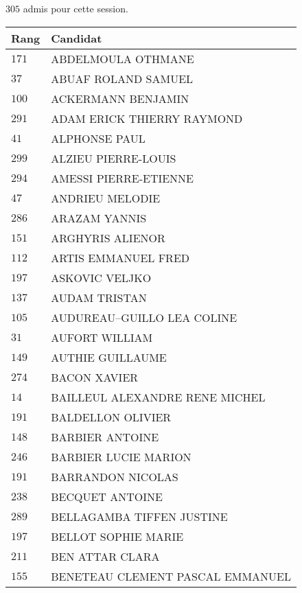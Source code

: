 



  $305$ admis pour cette session.

  \begin{xltabular}{\linewidth}{|l|X|}
    \hline
    \textbf{Rang} & \textbf{Candidat} \\
    \hline
    $171$ & ABDELMOULA OTHMANE \\
    \hline
    $37$ & ABUAF ROLAND SAMUEL \\
    \hline
    $100$ & ACKERMANN BENJAMIN \\
    \hline
    $291$ & ADAM ERICK THIERRY RAYMOND \\
    \hline
    $41$ & ALPHONSE PAUL \\
    \hline
    $299$ & ALZIEU PIERRE-LOUIS \\
    \hline
    $294$ & AMESSI PIERRE-ETIENNE \\
    \hline
    $47$ & ANDRIEU MELODIE \\
    \hline
    $286$ & ARAZAM YANNIS \\
    \hline
    $151$ & ARGHYRIS ALIENOR \\
    \hline
    $112$ & ARTIS EMMANUEL FRED \\
    \hline
    $197$ & ASKOVIC VELJKO \\
    \hline
    $137$ & AUDAM TRISTAN \\
    \hline
    $105$ & AUDUREAU--GUILLO LEA COLINE \\
    \hline
    $31$ & AUFORT WILLIAM \\
    \hline
    $149$ & AUTHIE GUILLAUME \\
    \hline
    $274$ & BACON XAVIER \\
    \hline
    $14$ & BAILLEUL ALEXANDRE RENE MICHEL \\
    \hline
    $191$ & BALDELLON OLIVIER \\
    \hline
    $148$ & BARBIER ANTOINE \\
    \hline
    $246$ & BARBIER LUCIE MARION \\
    \hline
    $191$ & BARRANDON NICOLAS \\
    \hline
    $238$ & BECQUET ANTOINE \\
    \hline
    $289$ & BELLAGAMBA TIFFEN JUSTINE \\
    \hline
    $197$ & BELLOT SOPHIE MARIE \\
    \hline
    $211$ & BEN ATTAR CLARA \\
    \hline
    $155$ & BENETEAU CLEMENT PASCAL EMMANUEL \\

\end{xltabular}
